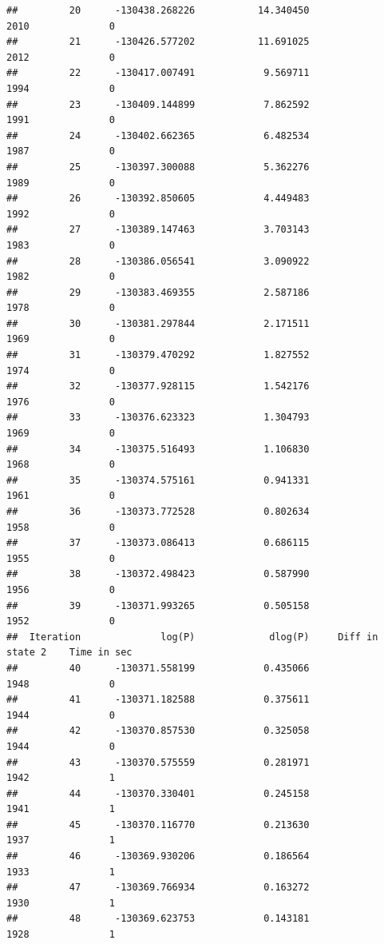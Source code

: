 \documentclass[11pt]{article}\usepackage[]{graphicx}\usepackage[]{color}
\makeatletter
\newenvironment{kframe}{%
 \def\at@end@of@kframe{}%
 \ifinner\ifhmode%
  \def\at@end@of@kframe{\end{minipage}}%
  \begin{minipage}{\columnwidth}%
 \fi\fi%
 \def\FrameCommand##1{\hskip\@totalleftmargin \hskip-\fboxsep
 \colorbox{shadecolor}{##1}\hskip-\fboxsep
     \hskip-\linewidth \hskip-\@totalleftmargin \hskip\columnwidth}%
 \MakeFramed {\advance\hsize-\width
   \@totalleftmargin\z@ \linewidth\hsize
   \@setminipage}}%
 {\par\unskip\endMakeFramed%
 \at@end@of@kframe}
\newenvironment{knitrout}{}{} %
\makeatother
\begin{document}
\begin{scriptsize}
\begin{knitrout}
\begin{kframe}
\begin{verbatim}
##         20      -130438.268226           14.340450                2010              0
##         21      -130426.577202           11.691025                2012              0
##         22      -130417.007491            9.569711                1994              0
##         23      -130409.144899            7.862592                1991              0
##         24      -130402.662365            6.482534                1987              0
##         25      -130397.300088            5.362276                1989              0
##         26      -130392.850605            4.449483                1992              0
##         27      -130389.147463            3.703143                1983              0
##         28      -130386.056541            3.090922                1982              0
##         29      -130383.469355            2.587186                1978              0
##         30      -130381.297844            2.171511                1969              0
##         31      -130379.470292            1.827552                1974              0
##         32      -130377.928115            1.542176                1976              0
##         33      -130376.623323            1.304793                1969              0
##         34      -130375.516493            1.106830                1968              0
##         35      -130374.575161            0.941331                1961              0
##         36      -130373.772528            0.802634                1958              0
##         37      -130373.086413            0.686115                1955              0
##         38      -130372.498423            0.587990                1956              0
##         39      -130371.993265            0.505158                1952              0
##  Iteration              log(P)             dlog(P)     Diff in state 2    Time in sec
##         40      -130371.558199            0.435066                1948              0
##         41      -130371.182588            0.375611                1944              0
##         42      -130370.857530            0.325058                1944              0
##         43      -130370.575559            0.281971                1942              1
##         44      -130370.330401            0.245158                1941              1
##         45      -130370.116770            0.213630                1937              1
##         46      -130369.930206            0.186564                1933              1
##         47      -130369.766934            0.163272                1930              1
##         48      -130369.623753            0.143181                1928              1

\end{verbatim}
\end{kframe}
\end{knitrout}
\end{scriptsize}
\end{document}
